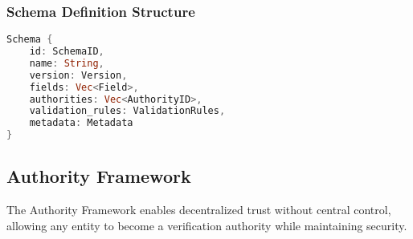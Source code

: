 \documentclass[11pt,a4paper]{article}
\begin{document}
\subsubsection{Schema Definition Structure}
\begin{lstlisting}[language=Rust, caption={Schema definition in Rust}]
Schema {
    id: SchemaID,
    name: String,
    version: Version,
    fields: Vec<Field>,
    authorities: Vec<AuthorityID>,
    validation_rules: ValidationRules,
    metadata: Metadata
}
\end{lstlisting}

\subsection{Authority Framework}

The Authority Framework enables decentralized trust without central control, allowing any entity to become a verification \gls{authority} while maintaining security.
\end{document}

